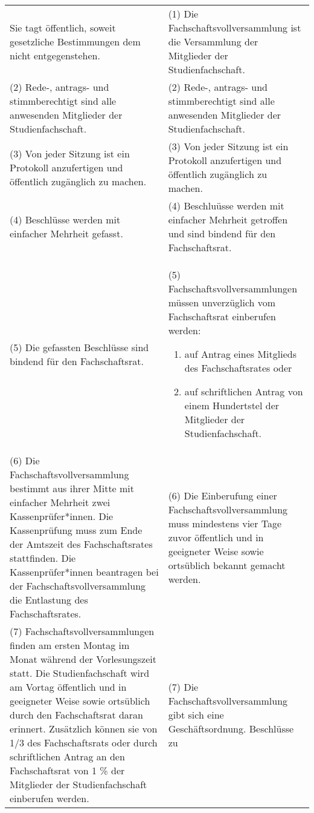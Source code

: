{\begin{longtable}{|p{7.5cm}|p{7.5cm}|}
        Sie tagt öffentlich, soweit gesetzliche Bestimmungen dem nicht entgegenstehen.&
        (1) Die Fachschaftsvollversammlung ist die Versammlung der Mitglieder der Studienfachschaft.\\
        (2) Rede-, antrags- und stimmberechtigt sind alle anwesenden Mitglieder der Studienfachschaft.&
        (2) Rede-, antrags- und stimmberechtigt sind alle anwesenden Mitglieder der Studienfachschaft.\\
        (3) Von jeder Sitzung ist ein Protokoll anzufertigen und öffentlich zugänglich zu machen.&
        (3) Von jeder Sitzung ist ein Protokoll anzufertigen und öffentlich zugänglich zu machen.\\
        (4) Beschlüsse werden mit einfacher Mehrheit gefasst.&
        (4) Beschluüsse werden mit einfacher Mehrheit getroffen und sind bindend für den Fachschaftsrat.\\
        (5) Die gefassten Beschlüsse sind bindend für den Fachschaftsrat.&
        (5) Fachschaftsvollversammlungen müssen unverzüglich vom Fachschaftsrat einberufen werden:
        \begin{enumerate}
            \item auf Antrag eines Mitglieds des Fachschaftsrates oder
            \item auf schriftlichen Antrag von einem Hundertstel der Mitglieder der
            Studienfachschaft.
        \end{enumerate}\\
        (6) Die Fachschaftsvollversammlung bestimmt aus ihrer Mitte mit einfacher Mehrheit
        zwei Kassenprüfer*innen. Die Kassenprüfung muss zum Ende der Amtszeit des Fachschaftsrates
        stattfinden. Die Kassenprüfer*innen beantragen bei der Fachschaftsvollversammlung die Entlastung
        des Fachschaftsrates.&
        (6) Die Einberufung einer Fachschaftsvollversammlung muss mindestens vier Tage zuvor öffentlich und
        in geeigneter Weise sowie ortsüblich bekannt gemacht werden.\\
        (7) Fachschaftsvollversammlungen finden am ersten Montag im Monat während der Vorlesungszeit statt.
        Die Studienfachschaft wird am Vortag öffentlich und in geeigneter Weise sowie ortsüblich durch den
        Fachschaftsrat daran erinnert. Zusätzlich können sie von 1/3 des Fachschaftsrats oder durch schriftlichen
        Antrag an den Fachschaftsrat von 1 \% der Mitglieder der Studienfachschaft einberufen werden.&
        (7) Die Fachschaftsvollversammlung gibt sich eine Geschäftsordnung. Beschlüsse zu

\end{longtable}}
